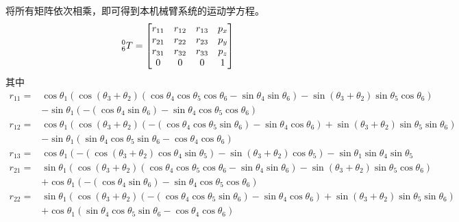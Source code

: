 \documentclass{ctexart}
\begin{document}
将所有矩阵依次相乘，即可得到本机械臂系统的运动学方程。
\[
    \prescript{0}{6}{T} = \begin{bmatrix}
        r_{11} & r_{12} & r_{13} & p_x \\
        r_{21} & r_{22} & r_{23} & p_y \\
        r_{31} & r_{32} & r_{33} & p_z \\
        0 & 0 & 0 & 1
    \end{bmatrix}
\]
其中
\[
    \begin{aligned}
        r_{11} = & \cos\theta_1 \left( \cos{\left( {{\theta }_3}+{{\theta }_2}\right) } \left( \cos\theta_4 \cos\theta_5 \cos\theta_6-\sin\theta_4 \sin\theta_6\right) - \sin{\left( {{\theta }_3}+{{\theta }_2}\right) } \sin\theta_5 \cos\theta_6\right) \\ 
        &-\sin\theta_1 \left( -\left( \cos\theta_4 \sin\theta_6\right) -\sin\theta_4 \cos\theta_5 \cos\theta_6\right)   \\
        r_{12} = & \cos\theta_1 \left( \cos{\left( {{\theta }_3}+{{\theta }_2}\right) } \left( -\left( \cos\theta_4 \cos\theta_5 \sin\theta_6\right) -\sin\theta_4 \cos\theta_6\right) +\sin{\left( {{\theta }_3}+{{\theta }_2}\right) } \sin\theta_5 \sin\theta_6\right) \\ 
        &-\sin\theta_1 \left( \sin\theta_4 \cos\theta_5 \sin\theta_6-\cos\theta_4 \cos\theta_6\right) \\
        r_{13} = & \cos\theta_1 \left( -\left( \cos{\left( {{\theta }_3}+{{\theta }_2}\right) } \cos\theta_4 \sin\theta_5\right) -\sin{\left( {{\theta }_3}+{{\theta }_2}\right) } \cos\theta_5\right) -\sin\theta_1 \sin\theta_4 \sin\theta_5 \\
        r_{21} = & \sin\theta_1 \left( \cos{\left( {{\theta }_3}+{{\theta }_2}\right) } \left( \cos\theta_4 \cos\theta_5 \cos\theta_6-\sin\theta_4 \sin\theta_6\right) -\sin{\left( {{\theta }_3}+{{\theta }_2}\right) } \sin\theta_5 \cos\theta_6\right) \\
        &+\cos\theta_1 \left( -\left( \cos\theta_4 \sin\theta_6\right) -\sin\theta_4 \cos\theta_5 \cos\theta_6\right) \\
        r_{22} = & \sin\theta_1 \left( \cos{\left( {{\theta }_3}+{{\theta }_2}\right) } \left( -\left( \cos\theta_4 \cos\theta_5 \sin\theta_6\right) -\sin\theta_4 \cos\theta_6\right) +\sin{\left( {{\theta }_3}+{{\theta }_2}\right) } \sin\theta_5 \sin\theta_6\right) \\
        & +\cos\theta_1 \left( \sin\theta_4 \cos\theta_5 \sin\theta_6-\cos\theta_4 \cos\theta_6\right) \\

\end{aligned}\]
\end{document}
